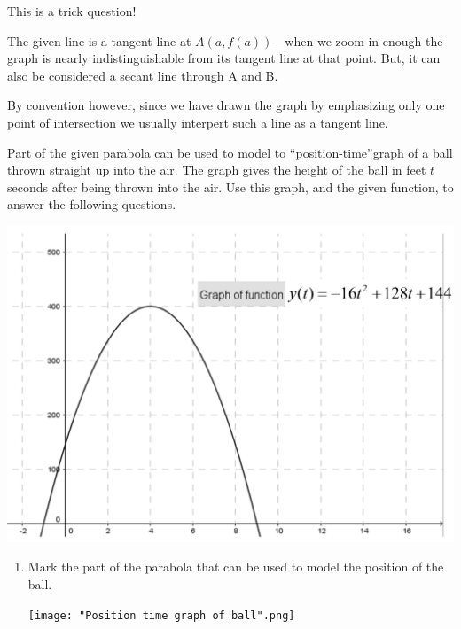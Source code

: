 \documentclass[nooutcomes,handout]{ximera}
\begin{document}
\begin{problem}
\begin{enumerate}
	\begin{freeResponse}
	This is a trick question!

        The given line is a tangent line at  $A(a,f(a))$---when we zoom in enough the graph is nearly indistinguishable from its tangent line at that point.
        But, it can also be considered a secant line through A and B.

        By convention however, since we have drawn the graph by emphasizing only one point of intersection we usually interpert such a line as a tangent line.
	      \end{freeResponse}
	\end{enumerate}

\end{problem}

\begin{problem}
 Part of the given parabola can be used to model to ``position-time''graph of a ball thrown straight up into the air.  The graph gives the height of the ball in feet $t$ seconds after being thrown into the air.
  Use this graph, and the given function, to answer the following questions.
  \begin{image}
    \includegraphics[scale = 0.5]{figure2.png}
  \end{image}
	
	
		\begin{enumerate}
		\item Mark the part of the parabola that can be used to model the position of the ball.		
		\begin{freeResponse} \hfil
       		 \begin{center}
       	  	 \texttt{[image: "Position time graph of ball".png]}
        		\end{center}
		\end{freeResponse}		


\end{enumerate}
\end{problem}
\end{document}
